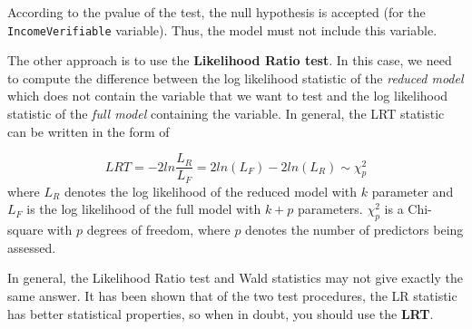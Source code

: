 \documentclass[]{book}
\makeatletter
\newenvironment{Shaded}{\begin{snugshade}}{\end{snugshade}}
\newcommand{\KeywordTok}[1]{\textcolor[rgb]{0.13,0.29,0.53}{\textbf{#1}}}
\newcommand{\DataTypeTok}[1]{\textcolor[rgb]{0.13,0.29,0.53}{#1}}
\newcommand{\DecValTok}[1]{\textcolor[rgb]{0.00,0.00,0.81}{#1}}
\newcommand{\StringTok}[1]{\textcolor[rgb]{0.31,0.60,0.02}{#1}}
\newcommand{\CommentTok}[1]{\textcolor[rgb]{0.56,0.35,0.01}{\textit{#1}}}
\newcommand{\OperatorTok}[1]{\textcolor[rgb]{0.81,0.36,0.00}{\textbf{#1}}}
\newcommand{\NormalTok}[1]{#1}
\newenvironment{kframe}{%
\medskip{}
\setlength{\fboxsep}{.8em}
 \def\at@end@of@kframe{}%
 \ifinner\ifhmode%
  \def\at@end@of@kframe{\end{minipage}}%
  \begin{minipage}{\columnwidth}%
 \fi\fi%
 \def\FrameCommand##1{\hskip\@totalleftmargin \hskip-\fboxsep
 \colorbox{shadecolor}{##1}\hskip-\fboxsep
     \hskip-\linewidth \hskip-\@totalleftmargin \hskip\columnwidth}%
 \MakeFramed {\advance\hsize-\width
   \@totalleftmargin\z@ \linewidth\hsize
   \@setminipage}}%
 {\par\unskip\endMakeFramed%
 \at@end@of@kframe}
\renewenvironment{Shaded}{\begin{kframe}}{\end{kframe}}
\theoremstyle{definition}
\theoremstyle{definition}
\theoremstyle{definition}
\theoremstyle{remark}
\let\BeginKnitrBlock\begin \let\EndKnitrBlock\end
\makeatother
\begin{document}
According to the pvalue of the test, the null hypothesis is accepted
(for the \texttt{IncomeVerifiable} variable). Thus, the model must not
include this variable.

The other approach is to use the \textbf{Likelihood Ratio test}. In this
case, we need to compute the difference between the log likelihood
statistic of the \emph{reduced model} which does not contain the
variable that we want to test and the log likelihood statistic of the
\emph{full model} containing the variable. In general, the LRT statistic
can be written in the form of

\[
LRT = -2 ln \frac{L_R}{L_F}= 2 ln(L_F) - 2 ln(L_R) \sim \chi^2_p
\] where \(L_R\) denotes the log likelihood of the reduced model with
\(k\) parameter and \(L_F\) is the log likelihood of the full model with
\(k + p\) parameters. \(\chi^2_p\) is a Chi-square with \(p\) degrees of
freedom, where \(p\) denotes the number of predictors being assessed.

\BeginKnitrBlock{rmdhint_sestelo}
In general, the Likelihood Ratio test and Wald statistics may not give
exactly the same answer. It has been shown that of the two test
procedures, the LR statistic has better statistical properties, so when
in doubt, you should use the \textbf{LRT}.
\EndKnitrBlock{rmdhint_sestelo}

\begin{Shaded}
\end{Shaded}
\end{document}
